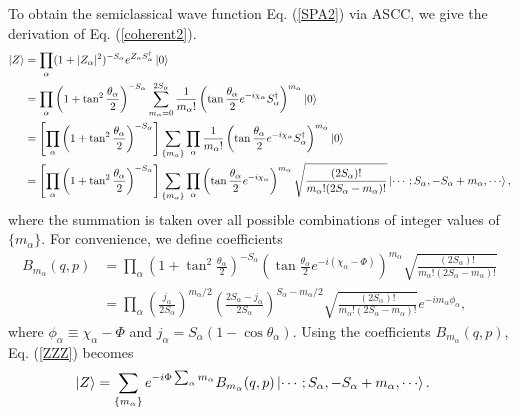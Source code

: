\documentclass[11pt]{book} %
\begin{document}
To obtain the semiclassical wave function Eq. (\ref{SPA2}) via ASCC, we give the derivation of Eq. (\ref{coherent2}).
\begin{align}
\ket{Z} &= \prod_{\alpha} (1+|Z_{\alpha}|^2)^{-S_{\alpha}}e^{Z_{\alpha}S_{\alpha}^{\dag}}\ket{0} \nonumber \\
&= \prod_{\alpha} \left(1+\tan^2{\frac{\theta_{\alpha}}{2}}\right)^{-S_{\alpha}} \sum_{m_{\alpha}=0}^{2S_{\alpha}} \frac{1}{m_{\alpha}!}
  \left(
  \tan{\frac{\theta_{\alpha}}{2}}e^{-i\chi_{\alpha}}S_{\alpha}^{\dag} \right)^{m_{\alpha}} \ket{0} \nonumber \\
&= \left[ \prod_{\alpha} \left(1+\tan^2{\frac{\theta_{\alpha}}{2}}\right)^{-S_{\alpha}} \right] 
\sum_{\{m_{\alpha}\}} \prod_{\alpha} \frac{1}{m_{\alpha}!} 
  \left(
  \tan{\frac{\theta_{\alpha}}{2}}e^{-i\chi_{\alpha}}S_{\alpha}^{\dag} \right)^{m_{\alpha}} \ket{0} \nonumber \\
&= \left[ \prod_{\alpha} \left(1+\tan^2{\frac{\theta_{\alpha}}{2}}\right)^{-S_{\alpha}} \right] 
\sum_{\{m_{\alpha}\}} \prod_{\alpha} \left(
  \tan{\frac{\theta_{\alpha}}{2}}e^{-i\chi_{\alpha}} \right)^{m_{\alpha}} \sqrt{\frac{(2S_{\alpha})!}{m_{\alpha}!(2S_{\alpha}-m_{\alpha})!}}
  \ket{\cdots;S_{\alpha},-S_{\alpha}+m_{\alpha},\cdots}, 
\label{ZZZ}
\end{align}
where the summation is taken over all possible combinations
of integer values of $\{ m_\alpha\}$. For convenience, we define coefficients
\begin{align}
B_{m_{\alpha}}(q,p) &= \prod_{\alpha} \left(1+\tan^2{\frac{\theta_{\alpha}}{2}}\right)^{-S_{\alpha}} \left(
  \tan{\frac{\theta_{\alpha}}{2}}e^{-i(\chi_{\alpha}-\Phi)} \right)^{m_{\alpha}} \sqrt{\frac{(2S_{\alpha})!}{m_{\alpha}!(2S_{\alpha}-m_{\alpha})!}} \nonumber \\
 &=\prod_\alpha \left(\frac{j_\alpha}{2S_\alpha}\right)^{m_\alpha/2}\left(\frac{2S_\alpha-j_\alpha}{2S_\alpha}\right)^{S_\alpha-m_\alpha/2}
 \sqrt{\frac{(2S_\alpha)!}{m_\alpha!(2S_\alpha-m_\alpha)!}}
e^{-i m_\alpha\phi_\alpha} ,
\end{align}
where $\phi_\alpha \equiv\chi_{\alpha}-\Phi$ and $j_\alpha=S_\alpha(1-\cos{\theta_\alpha})$. Using the coefficients $B_{m_{\alpha}}(q,p)$, Eq. (\ref{ZZZ}) becomes
\begin{align}
  \ket{Z} &= \sum_{\{m_{\alpha}\}} e^{-i\Phi \sum_\alpha m_{\alpha}} B_{m_{\alpha}}(q,p) \ket{\cdots;S_{\alpha},-S_{\alpha}+m_{\alpha},\cdots}.
\label{ZZZ1}
\end{align}
\end{document}

